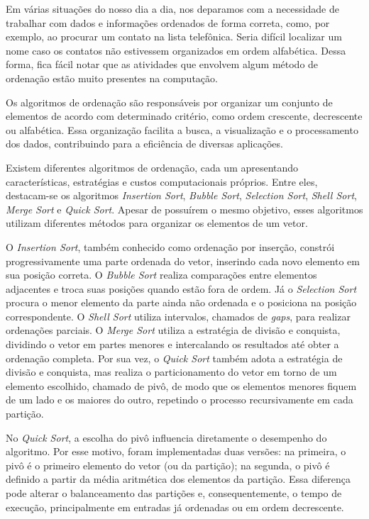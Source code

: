 \quad Em várias situações do nosso dia a dia, nos deparamos com a necessidade de trabalhar com dados e informações ordenados de forma correta, como, por exemplo, ao procurar um contato na lista telefônica. Seria difícil localizar um nome caso os contatos não estivessem organizados em ordem alfabética. Dessa forma, fica fácil notar que as atividades que envolvem algum método de ordenação estão muito presentes na computação.

\quad Os algoritmos de ordenação são responsáveis por organizar um conjunto de elementos de acordo com determinado critério, como ordem crescente, decrescente ou alfabética. Essa organização facilita a busca, a visualização e o processamento dos dados, contribuindo para a eficiência de diversas aplicações.

\quad Existem diferentes algoritmos de ordenação, cada um apresentando características, estratégias e custos computacionais próprios. Entre eles, destacam-se os algoritmos \textit{Insertion Sort}, \textit{Bubble Sort}, \textit{Selection Sort}, \textit{Shell Sort}, \textit{Merge Sort} e \textit{Quick Sort}. Apesar de possuírem o mesmo objetivo, esses algoritmos utilizam diferentes métodos para organizar os elementos de um vetor.

\quad O \textit{Insertion Sort}, também conhecido como ordenação por inserção, constrói progressivamente uma parte ordenada do vetor, inserindo cada novo elemento em sua posição correta. O \textit{Bubble Sort} realiza comparações entre elementos adjacentes e troca suas posições quando estão fora de ordem. Já o \textit{Selection Sort} procura o menor elemento da parte ainda não ordenada e o posiciona na posição correspondente. O \textit{Shell Sort} utiliza intervalos, chamados de \textit{gaps}, para realizar ordenações parciais. O \textit{Merge Sort} utiliza a estratégia de divisão e conquista, dividindo o vetor em partes menores e intercalando os resultados até obter a ordenação completa. Por sua vez, o \textit{Quick Sort} também adota a estratégia de divisão e conquista, mas realiza o particionamento do vetor em torno de um elemento escolhido, chamado de pivô, de modo que os elementos menores fiquem de um lado e os maiores do outro, repetindo o processo recursivamente em cada partição.

\quad No \textit{Quick Sort}, a escolha do pivô influencia diretamente o desempenho do algoritmo. Por esse motivo, foram implementadas duas versões: na primeira, o pivô é o primeiro elemento do vetor (ou da partição); na segunda, o pivô é definido a partir da média aritmética dos elementos da partição. Essa diferença pode alterar o balanceamento das partições e, consequentemente, o tempo de execução, principalmente em entradas já ordenadas ou em ordem decrescente.

